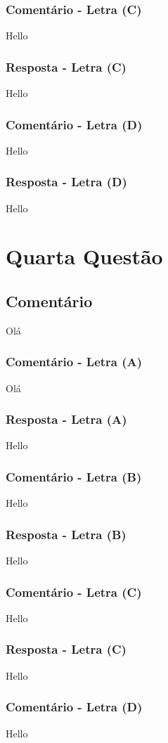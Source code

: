 \documentclass[12pt, a4paper]{article}
\begin{document}
		\subsubsection{Comentário - Letra (C)}
			Hello	
		\subsubsection{Resposta - Letra (C)}
			Hello
		\subsubsection{Comentário - Letra (D)}
			Hello	
		\subsubsection{Resposta - Letra (D)}
			Hello
\section{Quarta Questão}
	\subsection{Comentário}
		Olá
		\subsubsection{Comentário - Letra (A)}
			Olá
		\subsubsection{Resposta - Letra (A)}
			Hello
		\subsubsection{Comentário - Letra (B)}
			Hello
		\subsubsection{Resposta - Letra (B)}
			Hello
		\subsubsection{Comentário - Letra (C)}
			Hello	
		\subsubsection{Resposta - Letra (C)}
			Hello
		\subsubsection{Comentário - Letra (D)}
			Hello	
\end{document}
